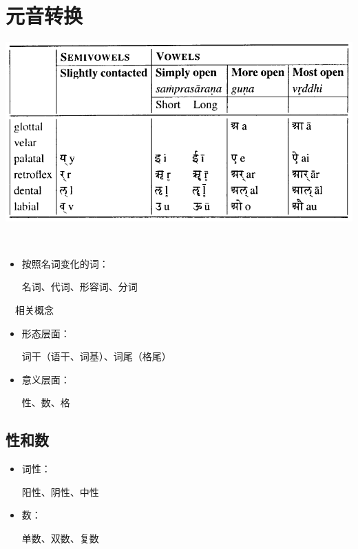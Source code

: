 \documentclass[17pt]{beamer}
\begin{document}
\section{元音转换}
\begin{frame}{\insertsection }
    \tableofcontents[currentsection]
\end{frame}

\begin{frame}{\insertsection }
    \centering    
    \includegraphics[width=\textwidth]{gunavrddhi.png}
\end{frame}

\begin{frame}{\insertsection ~~\insertsubsection}
  \begin{itemize}
    \item 按照名词变化的词：
    
    名词、代词、形容词、分词
  \end{itemize}
\end{frame}

\begin{frame}{\insertsection ~~相关概念}
  \begin{itemize}
    \item 形态层面：
    
    词干（语干、词基）、词尾（格尾）
    \item 意义层面：
      
    性、数、格
  \end{itemize}
\end{frame}

\subsection{性和数}
\begin{frame}{\insertsubsection}
  \begin{itemize}
    \item
      词性：
      
      阳性、阴性、中性
    \item
      数：
      
      单数、双数、复数
  \end{itemize}  
\end{frame}
\end{document}
